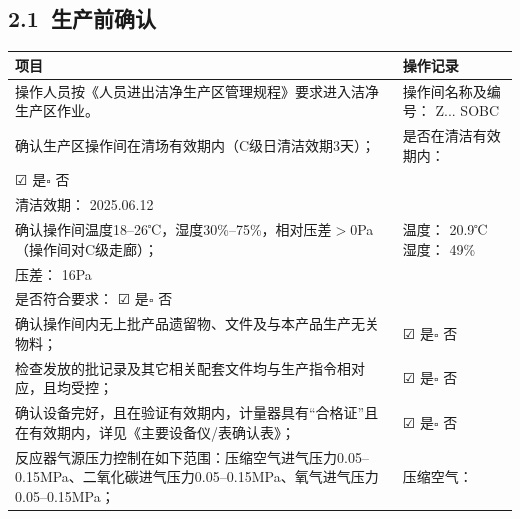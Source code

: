 \documentclass[UTF8,10pt,a4paper,fontset=fandol]{ctexart}
\newcommand{\fieldvalue}[1]{#1}
\newcommand{\handwritten}[1]{#1}
\begin{document}
\subsection*{2.1\ 生产前确认}

\begin{tabularx}{\textwidth}{|p{}|X|}
\hline
\centering 项目 & \centering 操作记录 \tabularnewline
\hline
操作人员按《人员进出洁净生产区管理规程》要求进入洁净生产区作业。 &
操作间名称及编号：
\fieldvalue{\handwritten{Z... SOBC}} \\
\hline
确认生产区操作间在清场有效期内（C级日清洁效期3天）； &
是否在清洁有效期内：\\
\fieldvalue{☑ 是}\quad $\square$ 否\\
清洁效期：
\fieldvalue{\handwritten{2025.06.12}} \\
\hline
确认操作间温度18--26℃，湿度30\%--75\%，相对压差$>0$Pa（操作间对C级走廊）； &
温度：
\fieldvalue{\handwritten{20.9}}℃\quad
湿度：
\fieldvalue{\handwritten{49\%}}\\
压差：
\fieldvalue{\handwritten{16}}Pa\\
是否符合要求：
\fieldvalue{☑ 是}\quad $\square$ 否 \\
\hline
确认操作间内无上批产品遗留物、文件及与本产品生产无关物料； &
\fieldvalue{☑ 是}\quad $\square$ 否 \\
\hline
检查发放的批记录及其它相关配套文件均与生产指令相对应，且均受控； &
\fieldvalue{☑ 是}\quad $\square$ 否 \\
\hline
确认设备完好，且在验证有效期内，计量器具有“合格证”且在有效期内，详见《主要设备仪/表确认表》； &
\fieldvalue{☑ 是}\quad $\square$ 否 \\
\hline
反应器气源压力控制在如下范围：压缩空气进气压力0.05--0.15MPa、二氧化碳进气压力0.05--0.15MPa、氧气进气压力0.05--0.15MPa； &
压缩空气：

\end{tabularx}
\end{document}
